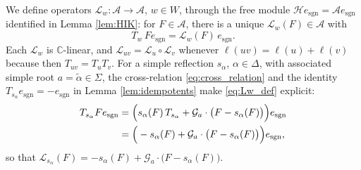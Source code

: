 \documentclass[12pt]{article}
\numberwithin{equation}{section}
\theoremstyle{definition}
\theoremstyle{remark}
\theoremstyle{plain}
\begin{document}
We define operators $\mathcal{L}_{w}: \mathcal{A} \to \mathcal{A}$, $w \in W$, through the free module $\mathcal{H}e_{\mathrm{sgn}} = \mathcal{A}e_{\mathrm{sgn}}$ identified in Lemma \ref{lem:HIK}: for $F \in \mathcal{A}$, there is a unique $\mathcal{L}_{w}(F) \in \mathcal{A}$ with
\begin{equation}\label{eq:Lw_def}
T_{w}\,Fe_{\mathrm{sgn}} = \mathcal{L}_{w}(F)\,e_{\mathrm{sgn}}.
\end{equation}
Each $\mathcal{L}_w$ is $\mathbb{C}$-linear, and $\mathcal{L}_{uv} = \mathcal{L}_{u}\circ\mathcal{L}_{v}$ whenever $\ell(uv) = \ell(u) + \ell(v)$ because then $T_{uv} = T_{u}T_{v}$. For a simple reflection $s_\alpha$, $\alpha \in \Delta$, with associated simple root $a = \tilde\alpha \in \Sigma$, the cross-relation \eqref{eq:cross_relation} and the identity $T_{s_\alpha}e_{\mathrm{sgn}} = -e_{\mathrm{sgn}}$ in Lemma \ref{lem:idempotents} make \eqref{eq:Lw_def} explicit:
\begin{align}\label{eq:Bernstein_esgn}
T_{s_\alpha} Fe_{\mathrm{sgn}} &= \Big(s_{\alpha}(F)\, T_{s_{\alpha}} + \mathcal{G}_a\cdot\big(F - s_\alpha(F)\big)\Big)e_{\mathrm{sgn}} \notag \\
&= \Big(-s_\alpha(F) + \mathcal{G}_a\cdot\big(F - s_\alpha(F)\big)\Big)e_{\mathrm{sgn}},
\end{align}
so that $\mathcal{L}_{s_{\alpha}}(F) = -s_\alpha(F) + \mathcal{G}_a\cdot\big(F - s_\alpha(F)\big)$. 
\end{document}
